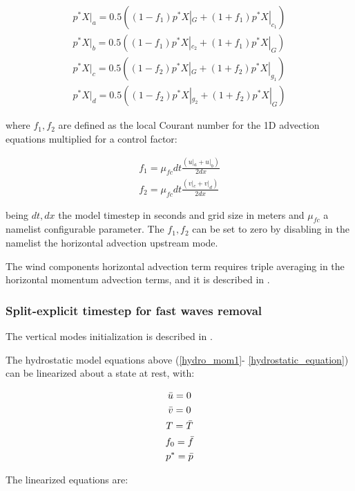 \begin{eqnarray}
\label{advection_equation_2}
p^*X|_a = 0.5 ( (1-f_1) p^*X|_{G} + (1+f_1) p^*X|_{c_1} ) \\
p^*X|_b = 0.5 ( (1-f_1) p^*X|_{c_2} + (1+f_1) p^*X|_{G} ) \\
p^*X|_c = 0.5 ( (1-f_2) p^*X|_{G} + (1+f_2) p^*X|_{g_1} ) \\
p^*X|_d = 0.5 ( (1-f_2) p^*X|_{g_2} + (1+f_2) p^*X|_{G} )
\end{eqnarray}

where $f_1,f_2$ are defined as the local Courant number for the 1D advection
equations multiplied for a control factor:

\begin{eqnarray}
\label{advection_equation_3}
f_1 = \mu_{fc} dt \frac{(u|_a + u|_b)}{2dx} \\
f_2 = \mu_{fc} dt \frac{(v|_c + v|_d)}{2dx}
\end{eqnarray}

being $dt, dx$ the model timestep in seconds and grid size in meters and
$\mu_{fc}$ a namelist configurable parameter. The $f_1,f_2$ can be set
to zero by disabling in the namelist the horizontal advection upstream mode.

The wind components horizontal advection term requires triple averaging in
the horizontal momentum advection terms, and it is described in
\cite{Anthes_72}.

\subsubsection{Split-explicit timestep for fast waves removal}

The vertical modes initialization is  described in \cite{Errico_88}.

The hydrostatic model equations above (\ref{hydro_mom1}-
\ref{hydrostatic_equation}) can be linearized about a state at rest,
with:

\begin{gather}
\label{reference_atm}
  \bar{u} = 0 \nonumber \\
  \bar{v} = 0 \nonumber \\
  T = \bar{T} \nonumber \\
  f_0 = \bar{f} \nonumber \\
  p^{\ast} = \bar{p}
\end{gather}

The linearized equations are:

